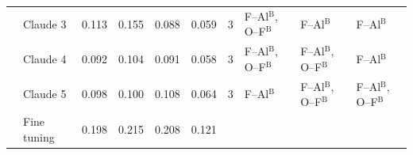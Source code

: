 \begin{table}[h]
\begin{tabular}{llrrrrrlll}
 & Claude 3 & 0.113 & 0.155 & 0.088 & 0.059 & 3 & F--Al$^\mathrm{B}$, O--F$^\mathrm{B}$ & F--Al$^\mathrm{B}$ & F--Al$^\mathrm{B}$ \\
 & Claude 4 & 0.092 & 0.104 & 0.091 & 0.058 & 3 & F--Al$^\mathrm{B}$, O--F$^\mathrm{B}$ & F--Al$^\mathrm{B}$, O--F$^\mathrm{B}$ & F--Al$^\mathrm{B}$ \\
 & Claude 5 & 0.098 & 0.100 & 0.108 & 0.064 & 3 & F--Al$^\mathrm{B}$ & F--Al$^\mathrm{B}$, O--F$^\mathrm{B}$ & F--Al$^\mathrm{B}$, O--F$^\mathrm{B}$ \\
 & Fine tuning & 0.198 & 0.215 & 0.208 & 0.121 & & & & \\
\bottomrule
\end{tabular}
\end{table}

\FloatBarrier




